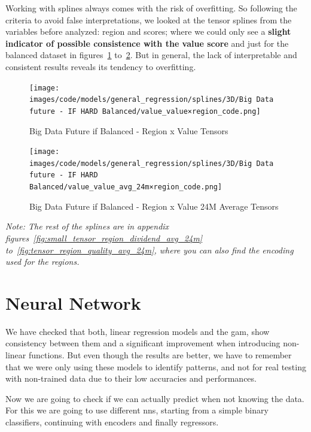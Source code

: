 \documentclass[11pt,english,a4paper,hidelinks]{book}
\begin{document}
\noindent Working with splines always comes with the risk of overfitting. So following the criteria to avoid false interpretations, we looked at the tensor splines from the variables before analyzed:  region and scores; where we could only see a \textbf{slight indicator of possible consistence with the value score} and just for the balanced dataset in figures~\ref{fig:tensor_region_value} to~\ref{fig:tensor_region_value_avg_24m}. But in general, the lack of interpretable and consistent results reveals its tendency to overfitting.

\begin{figure}[H]
    \centering
    \texttt{[image: images/code/models/general\_regression/splines/3D/Big Data future - IF HARD Balanced/value\_value×region\_code.png]}
    \caption{Big Data Future \acrshort{if} Balanced -  Region x Value Tensors}
    \label{fig:tensor_region_value}
\end{figure}

\begin{figure}[H]
    \centering
    \texttt{[image: images/code/models/general\_regression/splines/3D/Big Data future - IF HARD Balanced/value\_value\_avg\_24m×region\_code.png]}
    \caption{Big Data Future \acrshort{if} Balanced -  Region x Value 24M Average Tensors}
    \label{fig:tensor_region_value_avg_24m}
\end{figure}

\noindent \textit{Note: The rest of the splines are in appendix figures~\ref{fig:small_tensor_region_dividend_avg_24m} to~\ref{fig:tensor_region_quality_avg_24m}, where you can also find the encoding used for the regions.}

\section{Neural Network}

We have checked that both, linear regression models and the \acrshort{gam}, show consistency between them and a significant improvement when introducing non-linear functions. But even though the results are better, we have to remember that we were only using these models to identify patterns, and not for real testing with non-trained data due to their low accuracies and performances.

\vspace{0.5cm}

\noindent Now we are going to check if we can actually predict when not knowing the data. For this we are going to use different \acrshort{nn}s, starting from a simple binary classifiers, continuing with encoders and finally regressors.
\end{document}
